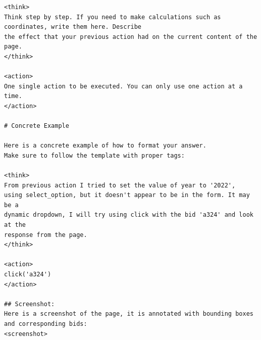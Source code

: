 \begin{verbatim}
<think>
Think step by step. If you need to make calculations such as coordinates, write them here. Describe
the effect that your previous action had on the current content of the page.
</think>

<action>
One single action to be executed. You can only use one action at a time.
</action>

# Concrete Example

Here is a concrete example of how to format your answer.
Make sure to follow the template with proper tags:

<think>
From previous action I tried to set the value of year to '2022',
using select_option, but it doesn't appear to be in the form. It may be a
dynamic dropdown, I will try using click with the bid 'a324' and look at the
response from the page.
</think>

<action>
click('a324')
</action>

## Screenshot:
Here is a screenshot of the page, it is annotated with bounding boxes and corresponding bids:
<screenshot>

\end{verbatim}

